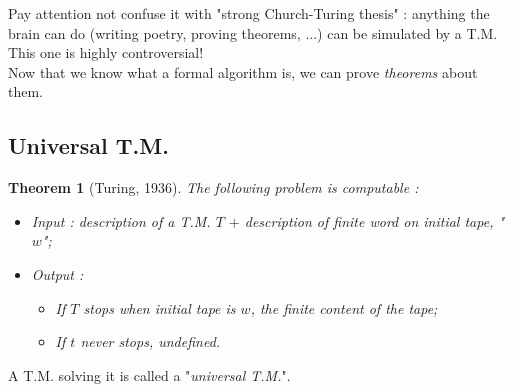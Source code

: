 \documentclass[12pt,a4paper]{report}
\theoremstyle{break}
\newtheorem{theorem}{Theorem}
\begin{document}
Pay attention not confuse it with "strong Church-Turing thesis" : anything the brain can do (writing poetry, proving theorems, ...) can be simulated by a T.M.\\
This one is highly controversial!\\

Now that we know what a formal algorithm is, we can prove \emph{theorems} about them.\\

\subsection*{Universal T.M.}

\begin{theorem}[Turing, 1936]
The following problem is computable : 
\begin{itemize}
\item[$\bullet$] \emph{Input} : description of a T.M. $T$ $+$ description of finite word on initial tape, "$w$";
\item[$\bullet$] \emph{Output} : \begin{itemize}
\item If $T$ stops when initial tape is $w$, \emph{the finite content of the tape};
\item If $t$ never stops, \emph{undefined}.
\end{itemize}
\end{itemize}
\end{theorem}

A T.M. solving it is called a "\emph{universal T.M.}".
\end{document}
